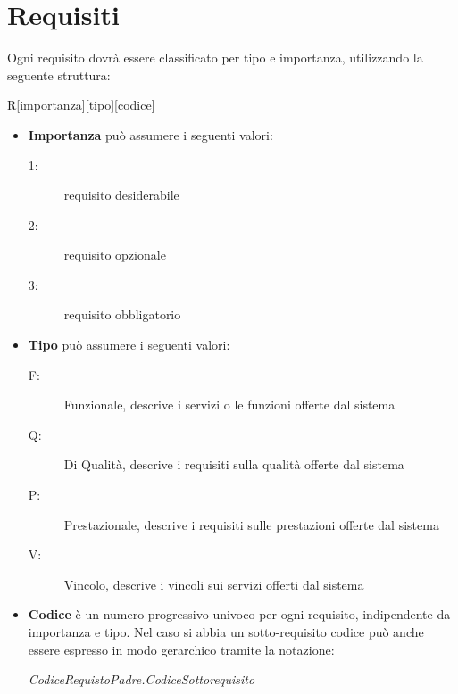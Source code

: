 \documentclass[12pt,a4paper,twoside,openright,english]{book}
\begin{document}
\section{Requisiti}\label{requisiti}
Ogni requisito dovrà essere classificato per tipo e importanza, utilizzando la seguente struttura:
\begin{center}
	R[importanza][tipo][codice]
\end{center}
\begin{itemize}
	\item \textbf{Importanza} può assumere i seguenti valori:
	\begin{description}
		\item[1:] requisito desiderabile
		\item[2:] requisito opzionale
		\item[3:] requisito obbligatorio
	\end{description}
	\item \textbf{Tipo} può assumere i seguenti valori:
	\begin{description}
		\item[F:] Funzionale, descrive i servizi o le funzioni offerte dal sistema
		\item[Q:] Di Qualità, descrive i requisiti sulla qualità offerte dal sistema
		\item[P:] Prestazionale, descrive i requisiti sulle prestazioni offerte dal sistema
		\item[V:] Vincolo, descrive i vincoli sui servizi offerti dal sistema
	\end{description}
	\item \textbf{Codice} è un numero progressivo univoco per ogni requisito, indipendente da importanza e tipo. Nel caso si abbia un sotto-requisito codice può anche essere espresso in modo gerarchico tramite la notazione:
	\begin{center}
		\textit{CodiceRequistoPadre.CodiceSottorequisito}
	\end{center}
\end{itemize}
\begin{small}

\end{small}
\end{document}
